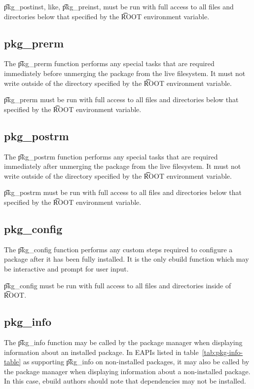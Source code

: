 \t{pkg\_postinst}, like, \t{pkg\_preinst}, must be run with full access to all files and directories
below that specified by the \t{ROOT} environment variable.

\subsection{pkg\_prerm}

The \t{pkg\_prerm} function performs any special tasks that are required immediately before
unmerging the package from the live filesystem. It must not write outside of the directory specified
by the \t{ROOT} environment variable.

\t{pkg\_prerm} must be run with full access to all files and directories below that specified by
the \t{ROOT} environment variable.

\subsection{pkg\_postrm}

The \t{pkg\_postrm} function performs any special tasks that are required immediately after
unmerging the package from the live filesystem. It must not write outside of the directory specified
by the \t{ROOT} environment variable.

\t{pkg\_postrm} must be run with full access to all files and directories below that specified by
the \t{ROOT} environment variable.

\subsection{pkg\_config}

The \t{pkg\_config} function performs any custom steps required to configure a package after it has been
fully installed. It is the only ebuild function which may be interactive and prompt for user input.

\t{pkg\_config} must be run with full access to all files and directories inside of \t{ROOT}.

\subsection{pkg\_info}

 The \t{pkg\_info} function may be called by the package manager when
displaying information about an installed package. In EAPIs listed in table~\ref{tab:pkg-info-table}
as supporting \t{pkg\_info} on non-installed packages, it may also be called by the package manager
when displaying information about a non-installed package. In this case, ebuild authors should note
that dependencies may not be installed.

